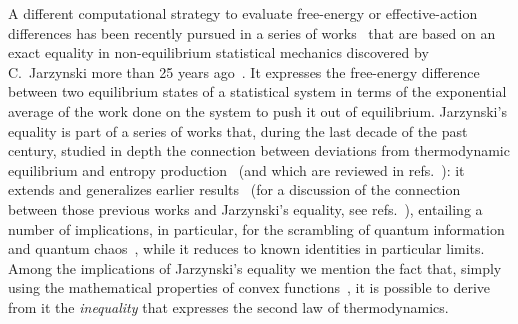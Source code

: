 \documentclass[11pt]{article}
\begin{document}
A different computational strategy to evaluate free-energy or effective-action differences has been recently pursued in a series of works~\cite{Chatelain:2006pdo, Chatelain:2007ts, Hijar:2007new, Caselle:2016wsw, Caselle:2018kap, Francesconi:2020fgi} that are based on an exact equality in non-equilibrium statistical mechanics discovered by C.~Jarzynski more than 25 years ago~\cite{Jarzynski:1996oqb, Jarzynski:1997ef}. It expresses the free-energy difference between two equilibrium states of a statistical system in terms of the exponential average of the work done on the system to push it out of equilibrium. Jarzynski's equality is part of a series of works that, during the last decade of the past century, studied in depth the connection between deviations from thermodynamic equilibrium and entropy production~\cite{Evans:1993po, Evans:1993em, Gallavotti:1994de, Gallavotti:1995de, Crooks:1997ne, Crooks:1999ep} (and which are reviewed in refs.~\cite{Ritort:2004wf, MariniBettoloMarconi:2008fd}): it extends and generalizes earlier results~\cite{Bochkov:1977gt, Bochkov:1979fd, Bochkov:1981nf} (for a discussion of the connection between those previous works and Jarzynski's equality, see refs.~\cite{Jarzynski:2006cof, Kuzovlev:2011sr}), entailing a number of implications, in particular, for the scrambling of quantum information and quantum chaos~\cite{Esposito:2009zz, DAlessio:2016rwt, Campisi:2016qlj, Halpern:2016zcm, Halpern:2017abm, Mori:2018qjb, Chenu:2018spm}, while it reduces to known identities in particular limits. Among the implications of Jarzynski's equality we mention the fact that, simply using the mathematical properties of convex functions~\cite{Jensen:1906sl}, it is possible to derive from it the \emph{inequality} that expresses the second law of thermodynamics.
\end{document}

